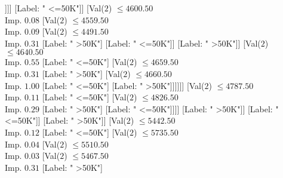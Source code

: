 \documentclass[margin=10pt]{standalone}
\begin{document}
\begin{forest}
																																															[Label: " <=50K"]
																																															[Label: " >50K"]]]]
																																												[Label: " <=50K"]]
																																											[Val($2$) $ \leq 4600.50$ \\ Imp. $0.08$
																																												[Val($2$) $ \leq 4559.50$ \\ Imp. $0.09$
																																													[Val($2$) $ \leq 4491.50$ \\ Imp. $0.31$
																																														[Label: " >50K"]
																																														[Label: " <=50K"]]
																																													[Label: " >50K"]]
																																												[Val($2$) $ \leq 4640.50$ \\ Imp. $0.55$
																																													[Label: " <=50K"]
																																													[Val($2$) $ \leq 4659.50$ \\ Imp. $0.31$
																																														[Label: " >50K"]
																																														[Val($2$) $ \leq 4660.50$ \\ Imp. $1.00$
																																															[Label: " <=50K"]
																																															[Label: " >50K"]]]]]]
																																										[Val($2$) $ \leq 4787.50$ \\ Imp. $0.11$
																																											[Label: " <=50K"]
																																											[Val($2$) $ \leq 4826.50$ \\ Imp. $0.29$
																																												[Label: " >50K"]
																																												[Label: " <=50K"]]]]
																																									[Label: " >50K"]]
																																								[Label: " <=50K"]]
																																							[Label: " >50K"]]
																																						[Val($2$) $ \leq 5442.50$ \\ Imp. $0.12$
																																							[Label: " <=50K"]
																																							[Val($2$) $ \leq 5735.50$ \\ Imp. $0.04$
																																								[Val($2$) $ \leq 5510.50$ \\ Imp. $0.03$
																																									[Val($2$) $ \leq 5467.50$ \\ Imp. $0.31$
																																										[Label: " >50K"]

\end{forest}
\end{document}
